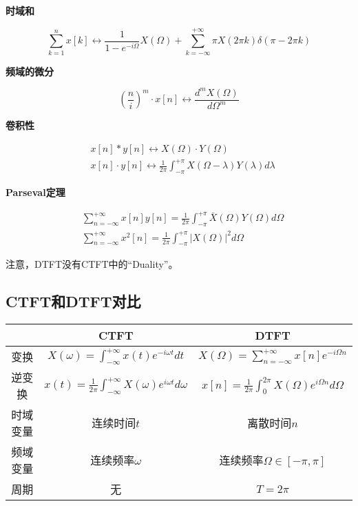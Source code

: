 {\bf 时域和}

\[
\sum_{k=1}^n{x\left[ k \right]}\leftrightarrow \frac{1}{1-e^{-i\varOmega}}X\left( \varOmega \right) +\sum_{k=-\infty}^{+\infty}{\pi X\left( 2\pi k \right) \delta \left( \pi -2\pi k \right)}
\]

{\bf 频域的微分}

\[
\left( \frac{n}{i} \right) ^m\cdot x\left[ n \right] \leftrightarrow \frac{d^mX\left( \varOmega \right)}{d\varOmega ^m}
\]

{\bf 卷积性}

\begin{align*}
&x\left[ n \right] \ast y\left[ n \right] \leftrightarrow X\left( \varOmega \right) \cdot Y\left( \varOmega \right) \\
&x\left[ n \right] \cdot y\left[ n \right] \leftrightarrow \frac{1}{2\pi}\int_{-\pi}^{+\pi}{X\left( \varOmega -\lambda \right) Y\left( \lambda \right) d\lambda}
\end{align*}

{\bf Parseval定理}

\begin{align*}
&\sum_{n=-\infty}^{+\infty}{x\left[ n \right] y\left[ n \right]}=\frac{1}{2\pi}\int_{-\pi}^{+\pi}{\bar{X}\left( \varOmega \right) Y\left( \varOmega \right) d\varOmega} \\
&\sum_{n=-\infty}^{+\infty}{x^2\left[ n \right]}=\frac{1}{2\pi}\int_{-\pi}^{+\pi}{\left| X\left( \varOmega \right) \right|^2d\varOmega}
\end{align*}

\begin{tcolorbox}
注意，DTFT没有CTFT中的“Duality”。
\end{tcolorbox}

\subsection{CTFT和DTFT对比}

\begin{table}[h]
\centering
\begin{tabular}{ccc}
    \toprule
    & CTFT & DTFT\\
    \midrule
    变换 & $X\left( \omega \right) =\int_{-\infty}^{+\infty}{x\left( t \right) e^{-i\omega t}dt}$ & $X\left( \varOmega \right) =\sum_{n=-\infty}^{+\infty}{x\left[ n \right] e^{-i\varOmega n}}$\\
    逆变换 & $x\left( t \right) =\frac{1}{2\pi}\int_{-\infty}^{+\infty}{X\left( \omega \right) e^{i\omega t}d\omega}$ & $x\left[ n \right] =\frac{1}{2\pi}\int_0^{2\pi}{X\left( \varOmega \right) e^{i\varOmega n}d\varOmega}$\\
    时域变量 & 连续时间$t$ & 离散时间$n$\\
    频域变量 & 连续频率$\omega $ & 连续频率$\varOmega \in \left[ -\pi ,\pi \right] $\\
    周期 & 无 & $T=2\pi $\\
    \bottomrule
\end{tabular}
\end{table}

